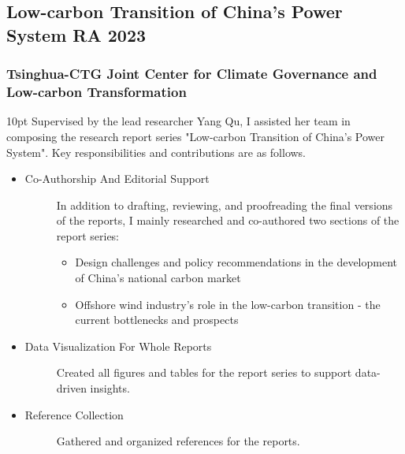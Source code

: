 \documentclass[a4paper]{article}
\begin{document}
\newpage
\subsection{Low-carbon Transition of China's Power System \normalfont \hfill RA \hfill 2023} 
\subsubsection{Tsinghua-CTG Joint Center for Climate Governance and Low-carbon Transformation} 
\vspace{3pt}
\begin{adjustwidth}{10pt}{}
    Supervised by the lead researcher Yang Qu, I assisted her team in composing the research report series "Low-carbon Transition of China’s Power System". Key responsibilities and contributions are as follows. 
\end{adjustwidth}

\begin{itemize}
    \item \begin{description}
        \item[Co-Authorship And Editorial Support] In addition to drafting, reviewing, and proofreading the final versions of the reports, I mainly researched and co-authored two sections of the report series:
        \begin{itemize}
            \item Design challenges and policy recommendations in the development of China's national carbon market
            \item Offshore wind industry’s role in the low-carbon transition - the current bottlenecks and prospects
        \end{itemize}
    \end{description}
    \item \begin{description}
        \item[Data Visualization For Whole Reports] Created all figures and tables for the report series to support data-driven insights.
    \end{description} 
    \item \begin{description}
        \item[Reference Collection] Gathered and organized references for the reports. 
    \end{description}
\end{itemize}
\end{document}
